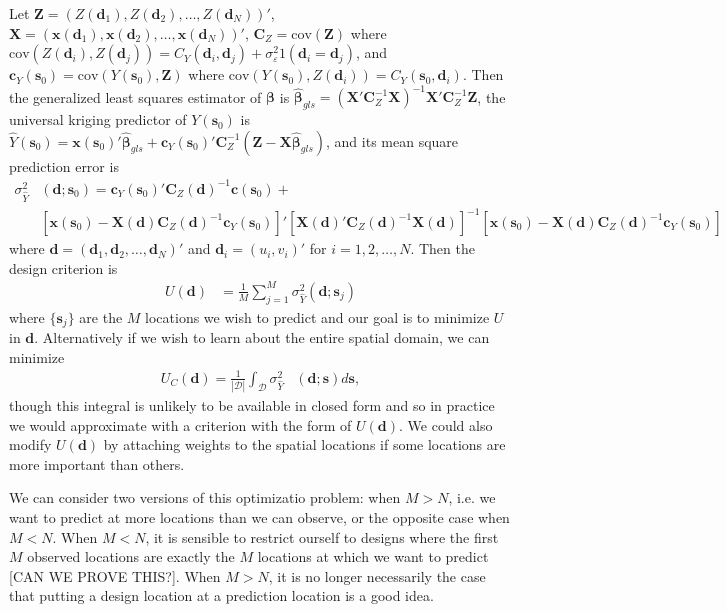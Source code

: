 \documentclass[12pt]{article}
\begin{document}
Let $\bm{Z} = (Z(\bm{d}_1), Z(\bm{d}_2), \dots, Z(\bm{d}_N) )'$, $\bm{X} = (\bm{x}(\bm{d}_1), \bm{x}(\bm{d}_2), \dots, \bm{x}(\bm{d}_N))'$, $\bm{C}_Z = \mathrm{cov}(\bm{Z})$ where $\mathrm{cov}(Z(\bm{d}_i), Z(\bm{d}_j)) = C_Y(\bm{d}_i,\bm{d}_j) + \sigma^2_\varepsilon 1(\bm{d}_i = \bm{d}_j)$, and $\bm{c}_Y(\bm{s}_0) = \mathrm{cov}(Y(\bm{s}_0), \bm{Z})$ where $\mathrm{cov}(Y(\bm{s}_0), Z(\bm{d}_i)) = C_Y(\bm{s}_0, \bm{d}_i)$. Then the generalized least squares estimator of $\bm{\beta}$ is $\widehat{\bm{\beta}}_{gls} = (\bm{X}'\bm{C}_Z^{-1}\bm{X})^{-1}\bm{X}'\bm{C}_Z^{-1}\bm{Z}$, the universal kriging predictor of $Y(\bm{s}_0)$ is $\widehat{Y}(\bm{s}_0) = \bm{x}(\bm{s}_0)'\widehat{\bm{\beta}}_{gls} + \bm{c}_Y(\bm{s}_0)'\bm{C}_Z^{-1}(\bm{Z} - \bm{X}\widehat{\bm{\beta}}_{gls})$, and its mean square prediction error is 
\begin{align*}
\sigma^2_{\widehat{Y}}&(\bm{d};\bm{s}_0) = \bm{c}_Y(\bm{s}_0)'\bm{C}_Z(\bm{d})^{-1}\bm{c}(\bm{s}_0) + \\
&\left[\bm{x}(\bm{s}_0) - \bm{X}(\bm{d})\bm{C}_Z(\bm{d})^{-1}\bm{c}_Y(\bm{s}_0)\right]'\left[\bm{X}(\bm{d})'\bm{C}_Z(\bm{d})^{-1}\bm{X}(\bm{d})\right]^{-1}\left[\bm{x}(\bm{s}_0) - \bm{X}(\bm{d})\bm{C}_Z(\bm{d})^{-1}\bm{c}_Y(\bm{s}_0)\right]
\end{align*}
where $\bm{d}=(\bm{d}_1, \bm{d}_2, \dots, \bm{d}_N)'$ and $\bm{d}_i=(u_i, v_i)'$ for $i=1,2,\dots,N$. Then the design criterion is
\begin{align*}
U(\bm{d}) &= \frac{1}{M}\sum_{j=1}^M\sigma^2_{\widehat{Y}}(\bm{d};\bm{s}_j)
\end{align*}
where $\{\bm{s}_j\}$ are the $M$ locations we wish to predict and our goal is to minimize $U$ in $\bm{d}$. Alternatively if we wish to learn about the entire spatial domain, we can minimize
\begin{align*}
U_C(\bm{d}) = \frac{1}{|\mathcal{D}|}\int_{\mathcal{D}}\sigma^2_{\widehat{Y}}&(\bm{d};\bm{s})d\bm{s},
\end{align*}
though this integral is unlikely to be available in closed form and so in practice we would approximate with a criterion with the form of $U(\bm{d})$. We could also modify $U(\bm{d})$ by attaching weights to the spatial locations if some locations are more important than others.

We can consider two versions of this optimizatio problem: when $M>N$, i.e. we want to predict at more locations than we can observe, or the opposite case when $M<N$. When $M<N$, it is sensible to restrict ourself to designs where the first $M$ observed locations are exactly the $M$ locations at which we want to predict [CAN WE PROVE THIS?]. When $M>N$, it is no longer necessarily the case that putting a design location at a prediction location is a good idea.
\end{document}
